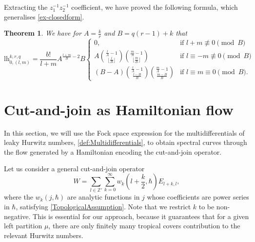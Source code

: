 \documentclass[10pt,a4paper,oneside,no-math,reqno]{amsart}%
\theoremstyle{plain}
\newtheorem{theorem}{Theorem}[section]
\theoremstyle{definition}
\theoremstyle{remark}
\numberwithin{equation}{section}
\newcommand{\mb}[1]{\mathbb{#1}}
\newcommand{\1}{\mathds{1}}
\newcommand{\Z}{\mb{Z}}
\newcommand{\<}{\langle}
\renewcommand{\>}{\rangle}
\newcommand{\lh}{\mathord{\mathrm{l\!h}}}
\begin{document}
Extracting the $z_1^{-1}z_2^{-1}$ coefficient, we have proved the following formula, which generalises \cref{ex-closedform}.

\begin{theorem}
    We have for $A = \frac{k}{r}$ and $B = q(r-1)+k$ that
    \begin{equation}
        \lh_{0,(l,m)}^{k,r,q}
        =\frac{b!}{l+m} A^{\frac{l+m}{B}-2} B \begin{cases}
            0, &\textrm{if $l+m\not\equiv 0\pmod{B}$}\\
            A \binom{\frac{l}{A} - 1}{ \lfloor \frac{l}{B} \rfloor } \binom{\frac{m}{A} - 1}{ \lfloor \frac{m}{B} \rfloor } &\textrm{if $l\equiv - m \not\equiv 0 \pmod{B}$}\\           
            (B - A) \binom{\frac{l}{A} - 1}{\frac{l-B}{B}} \binom{\frac{m}{A} - 1}{\frac{m-B}{B}} &\textrm{if $l \equiv m \equiv 0\pmod{B}$}.
        \end{cases}
    \end{equation}
\end{theorem}


\section{Cut-and-join as Hamiltonian flow}
\label{CJSection}

In this section, we will use the Fock space expression for the multidifferentials of leaky Hurwitz numbers, \cref{def:Multidifferentials}, to obtain spectral curves through the flow generated by a Hamiltonian encoding the cut-and-join operator.

Let us consider a general cut-and-join operator
\begin{equation}
	W
	=
	\sum_{l \in \Z'} \sum_{k = 0}^\infty w_k (l + \frac{k}{2} ,\hbar) E_{l + k,l} ,
\end{equation}
where the $ w_k (j, \hbar)$ are analytic functions in $ j$ whose coefficients are power series in $ \hbar$, satisfying \cref{TopologicalAssumption}. Note that we restrict $ k $ to be non-negative. This is essential for our approach, because it guarantees that for a given left partition $ \mu$, there are only finitely many tropical covers contribution to the relevant Hurwitz numbers.
\end{document}
